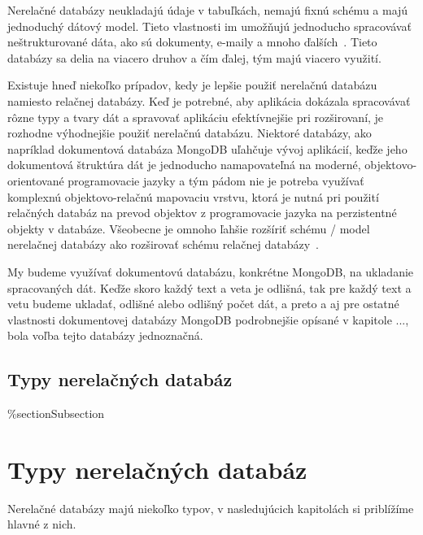 Nerelačné databázy neukladajú údaje v tabuľkách, nemajú fixnú schému a majú jednoduchý dátový model. Tieto vlastnosti im umožňujú jednoducho spracovávať neštrukturované dáta, ako sú dokumenty, e-maily a mnoho ďalších~\cite{MongoDBvsMySQL2015}. Tieto databázy sa delia na viacero druhov a čím ďalej, tým majú viacero využití.

Existuje hneď niekoľko prípadov, kedy je lepšie použiť nerelačnú databázu namiesto relačnej databázy. Keď je potrebné, aby aplikácia dokázala spracovávať rôzne typy a tvary dát a spravovať aplikáciu efektívnejšie pri rozširovaní, je rozhodne výhodnejšie použiť nerelačnú databázu. Niektoré databázy, ako napríklad dokumentová databáza MongoDB uľahčuje vývoj aplikácií, keďže jeho dokumentová štruktúra dát je jednoducho namapovateľná na moderné, objektovo-orientované programovacie jazyky a tým pádom nie je potreba využívať komplexnú objektovo-relačnú mapovaciu vrstvu, ktorá je nutná pri použití relačných databáz na prevod objektov z programovacie jazyka na perzistentné objekty v databáze. Všeobecne je omnoho ľahšie rozšíriť schému / model nerelačnej databázy ako rozširovať schému relačnej databázy~\cite{MongoDBvsMySQLCompared}.

My budeme využívať dokumentovú databázu, konkrétne MongoDB, na ukladanie spracovaných dát. Keďže skoro každý text a veta je odlišná, tak pre každý text a vetu budeme ukladať, odlišné alebo odlišný počet dát, a preto a aj pre ostatné vlastnosti dokumentovej databázy MongoDB podrobnejšie opísané v kapitole ..., bola voľba tejto databázy jednoznačná.

%
{
	\subsection{Typy nerelačných databáz}
}
{
	\%section{Subsection}
	\section{Typy nerelačných databáz}
}
\label{subsection:types_of_norelation_dbs}
Nerelačné databázy majú niekoľko typov, v nasledujúcich kapitolách si priblížíme hlavné z nich.

